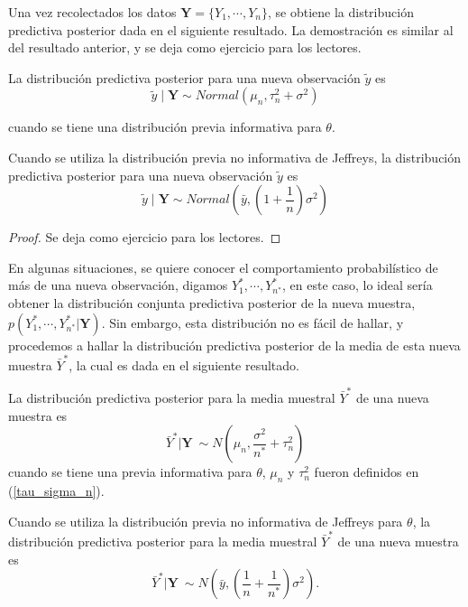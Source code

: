     Una vez recolectados los datos $\mathbf{Y}=\{Y_1,\cdots,Y_n\}$, se obtiene la distribuci\'on predictiva posterior dada en el siguiente resultado. La demostraci\'on es similar al del resultado anterior, y se deja como ejercicio para los lectores.
    \begin{Res}\label{pred_y_theta}
    La distribuci\'on predictiva posterior para una nueva observaci\'on $\tilde{y}$ es
    \begin{equation*}
    \tilde{y} \mid \mathbf{Y} \sim Normal (\mu_n, \tau_n^2+\sigma^2)
    \end{equation*}
    
    cuando se tiene una distribuci\'on previa informativa para $\theta$. 
    
    Cuando se utiliza la distribuci\'on previa no informativa de Jeffreys, la distribuci\'on predictiva posterior para una nueva observaci\'on $\tilde{y}$ es
    \begin{equation*}
    \tilde{y} \mid \mathbf{Y} \sim Normal \left(\bar{y}, \left(1+\dfrac{1}{n}\right)\sigma^2\right)
    \end{equation*}
    \end{Res}
    
    \begin{proof}
    \label{Res_pred_normal}
    Se deja como ejercicio para los lectores.
    \end{proof}
    
    En algunas situaciones, se quiere conocer el comportamiento probabil\'istico de m\'as de una nueva observaci\'on, digamos $Y_1^*,\cdots,Y_{n^*}^*$, en este caso, lo ideal ser\'ia obtener la distribuci\'on conjunta predictiva posterior de la nueva muestra, $p(Y_1^*,\cdots,Y_{n^*}^*|\mathbf{Y})$. Sin embargo, esta distribuci\'on no es f\'acil de hallar, y procedemos a hallar la distribuci\'on predictiva posterior de la media de esta nueva muestra $\bar{Y}^*$, la cual es dada en el siguiente resultado. 
    
    \begin{Res}\label{pred_norm}
    La distribuci\'on predictiva posterior para la media muestral $\bar{Y}^*$ de una nueva muestra es 
    \begin{equation*}
    \bar{Y}^*|\mathbf{Y}\ \sim N\left(\mu_n, \frac{\sigma^2}{n^*}+\tau^2_n\right)
    \end{equation*}
    cuando se tiene una previa informativa para $\theta$, $\mu_n$ y $\tau^2_n$ fueron definidos en (\ref{tau_sigma_n}).
    
    Cuando se utiliza la distribuci\'on previa no informativa de Jeffreys para $\theta$, la distribuci\'on predictiva posterior para la media muestral $\bar{Y}^*$ de una nueva muestra es 
    \begin{equation*}
    \bar{Y}^*|\mathbf{Y}\ \sim N\left(\bar{y}, \left(\dfrac{1}{n}+\dfrac{1}{n^*}\right)\sigma^2\right).
    \end{equation*}
    \end{Res}
    
